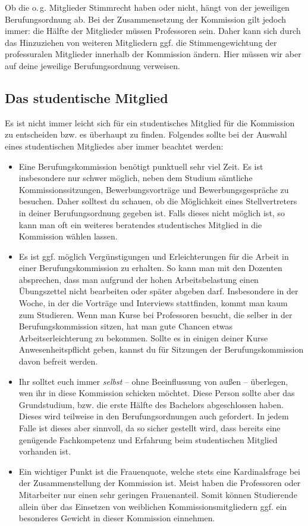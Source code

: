 \documentclass[10pt,twoside,a5paper,openright]{book}
\begin{document}
Ob die o.\,g. Mitglieder Stimmrecht haben oder nicht, hängt von der jeweiligen Berufungsordnung ab. Bei der Zusammensetzung der Kommission gilt jedoch immer: die Hälfte der Mitglieder müssen Professoren sein. Daher kann sich durch das Hinzuziehen von weiteren Mitgliedern ggf. die Stimmengewichtung der professuralen Mitglieder innerhalb der Kommission ändern. Hier müssen wir aber auf deine jeweilige Berufungsordnung verweisen.

\subsection{Das studentische Mitglied}
Es ist nicht immer leicht sich für ein studentisches Mitglied für die Kommission zu entscheiden bzw. es überhaupt zu finden. Folgendes sollte bei der Auswahl eines studentischen Mitgliedes aber immer beachtet werden:
\begin{itemize}
	\item Eine Berufungskommission benötigt punktuell sehr viel Zeit. Es ist insbesondere nur schwer möglich, neben dem Studium sämtliche Kommissionssitzungen, Bewerbungsvorträge und Bewerbungsgespräche zu besuchen. Daher solltest du schauen, ob die Möglichkeit eines Stellvertreters in deiner Berufungsordnung gegeben ist. Falls dieses nicht möglich ist, so kann man oft ein weiteres beratendes studentisches Mitglied in die Kommission wählen lassen.
	
	\item Es ist ggf. möglich Vergünstigungen und Erleichterungen für die Arbeit in einer Berufungskommission zu erhalten. So kann man mit den Dozenten absprechen, dass man aufgrund der hohen Arbeitsbelastung einen Übungszettel nicht bearbeiten oder später abgeben darf. Insbesondere in der Woche, in der die Vorträge und Interviews stattfinden, kommt man kaum zum Studieren. Wenn man Kurse bei Professoren besucht, die selber in der Berufungskommission sitzen, hat man gute Chancen etwas Arbeitserleichterung zu bekommen. Sollte es in einigen deiner Kurse Anwesenheitspflicht geben, kannst du für Sitzungen der Berufungskommission davon befreit werden. 
	
	\item Ihr solltet euch immer \emph{selbst} -- ohne Beeinflussung von außen -- überlegen, wen ihr in diese Kommission schicken möchtet. Diese Person sollte aber das Grundstudium, bzw. die erste Hälfte des Bachelors abgeschlossen haben. Dieses wird teilweise in den Berufungsordnungen auch gefordert. In jedem Falle ist dieses aber sinnvoll, da so sicher gestellt wird, dass bereits eine genügende Fachkompetenz und Erfahrung beim studentischen Mitglied vorhanden ist.
	
	\item Ein wichtiger Punkt ist die Frauenquote, welche stets eine Kardinalsfrage bei der Zusammenstellung der Kommission ist. Meist haben die Professoren oder Mitarbeiter nur einen sehr geringen Frauenanteil. Somit können Studierende allein über das Einsetzen von weiblichen Kommissionsmitgliedern ggf. ein besonderes Gewicht in dieser Kommission einnehmen.
\end{itemize}
\end{document}
